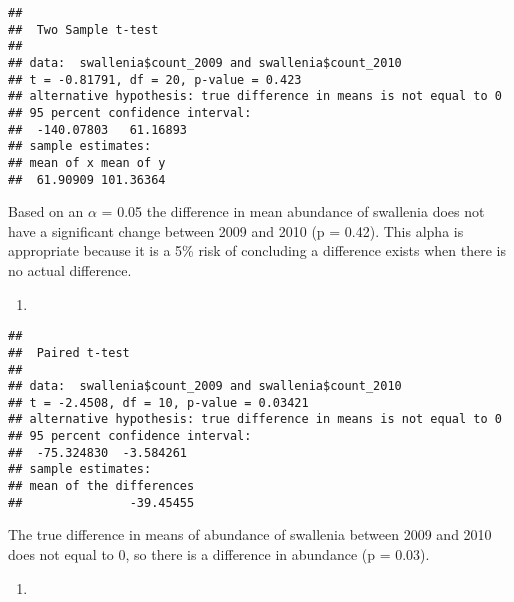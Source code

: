 \documentclass[]{article}
\newenvironment{Shaded}{\begin{snugshade}}{\end{snugshade}}
\newcommand{\KeywordTok}[1]{\textcolor[rgb]{0.13,0.29,0.53}{\textbf{#1}}}
\newcommand{\DataTypeTok}[1]{\textcolor[rgb]{0.13,0.29,0.53}{#1}}
\newcommand{\DecValTok}[1]{\textcolor[rgb]{0.00,0.00,0.81}{#1}}
\newcommand{\StringTok}[1]{\textcolor[rgb]{0.31,0.60,0.02}{#1}}
\newcommand{\CommentTok}[1]{\textcolor[rgb]{0.56,0.35,0.01}{\textit{#1}}}
\newcommand{\OtherTok}[1]{\textcolor[rgb]{0.56,0.35,0.01}{#1}}
\newcommand{\OperatorTok}[1]{\textcolor[rgb]{0.81,0.36,0.00}{\textbf{#1}}}
\newcommand{\NormalTok}[1]{#1}
\begin{document}
\begin{verbatim}
## 
##  Two Sample t-test
## 
## data:  swallenia$count_2009 and swallenia$count_2010
## t = -0.81791, df = 20, p-value = 0.423
## alternative hypothesis: true difference in means is not equal to 0
## 95 percent confidence interval:
##  -140.07803   61.16893
## sample estimates:
## mean of x mean of y 
##  61.90909 101.36364
\end{verbatim}

Based on an \(\alpha\) = 0.05 the difference in mean abundance of
swallenia does not have a significant change between 2009 and 2010 (p =
0.42). This alpha is appropriate because it is a 5\% risk of concluding
a difference exists when there is no actual difference.

\begin{enumerate}
\def\labelenumi{\arabic{enumi}.}
\setcounter{enumi}{2}
\item
\end{enumerate}

\begin{Shaded}
\end{Shaded}

\begin{verbatim}
## 
##  Paired t-test
## 
## data:  swallenia$count_2009 and swallenia$count_2010
## t = -2.4508, df = 10, p-value = 0.03421
## alternative hypothesis: true difference in means is not equal to 0
## 95 percent confidence interval:
##  -75.324830  -3.584261
## sample estimates:
## mean of the differences 
##               -39.45455
\end{verbatim}

The true difference in means of abundance of swallenia between 2009 and
2010 does not equal to 0, so there is a difference in abundance (p =
0.03).

\begin{enumerate}
\def\labelenumi{\arabic{enumi}.}
\setcounter{enumi}{3}
\item
\end{enumerate}
\end{document}
